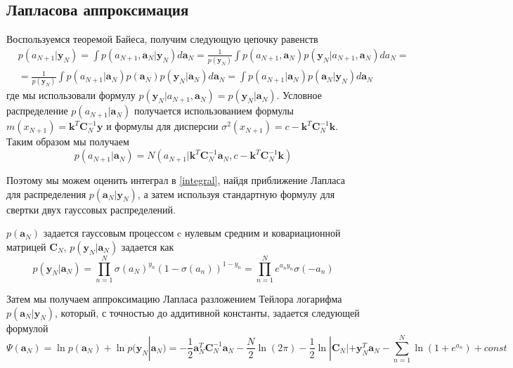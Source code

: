 {\subsection{Лапласова аппроксимация}
Воспользуемся теоремой Байеса, получим следующую цепочку равенств
\begin{equation}
    \label{integral}
    \begin{split}
         & p(a_{N+1}|\mathbf{y}_{N}) = \int p(a_{N+1},\mathbf{a}_{N}|\mathbf{y}_N)d\mathbf{a}_{N}
        = \frac{1}{p(\mathbf{y}_N)} \int p(a_{N+1},\mathbf{a}_{N})p(\mathbf{y}_{N}|a_{N+1},\mathbf{a}_{N})da_{N}=                                                                                                     \\
         & =\frac{1}{p(\mathbf{y}_{N})} \int p(a_{N+1}|\mathbf{a}_{N})p(\mathbf{a}_{N})p(\mathbf{y}_{N}|\mathbf{a}_{N})d\mathbf{a}_{N}= \int p(a_{N+1}|\mathbf{a}_{N})p(\mathbf{a}_{N}|\mathbf{y}_{N})d\mathbf{a}_{N}
    \end{split}
\end{equation}
где мы использовали формулу $p(\mathbf{y}_{N}|a_{N+1},\mathbf{a}_{N})=p(\mathbf{y}_{N}|\mathbf{a}_{N})$.
Условное распределение $p(a_{N+1}|\mathbf{a}_{N})$ получается использованием формулы  $m(x_{N+1}) = \mathbf{k}^T\mathbf{C}^{-1}_N\mathbf{y}$ и формулы для дисперсии $\sigma^2(x_{N+1}) = c-\mathbf{k}^T\mathbf{C}^{-1}_N\mathbf{k}$. Таким образом мы получаем
\[
    \label{condition}
    p(a_{N+1}|\mathbf{a}_{N})=N(a_{N+1}|\mathbf{k}^T\mathbf{C}^
    {-1}_N\mathbf{a}_{N},c-\mathbf{k}^T\mathbf{C}^{-1}_N\mathbf{k})\]

Поэтому мы можем оценить интеграл в \ref{integral}, найдя приближение Лапласа
для распределения $p(\mathbf{a}_{N}|\mathbf{y}_{N})$, а затем используя стандартную формулу для
свертки двух гауссовых распределений.

$p(\mathbf{a}_{N})$ задается гауссовым процессом c нулевым средним и ковариационной матрицей $\mathbf{C}_{N}$, $p(\mathbf{y}_{N}|\mathbf{a}_{N})$ задается как
\[
    p(\mathbf{y}_{N}|\mathbf{a}_{N})=\displaystyle \prod_{n=1}^{N}\sigma(a_{N})^{y_n}(1-\sigma(a_{n}))^{1-y_n} =
    \displaystyle \prod_{n=1}^{N} e^{a_ny_n}\sigma(-a_n)\]

Затем мы получаем аппроксимацию Лапласа разложением Тейлора логарифма $p(\mathbf{a}_{N}|\mathbf{y}_N)$, который, с точностью до аддитивной константы, задается следующей формулой
\begin{equation}
    \label{PSI}
    \Psi(\mathbf{a}_N) = \ln p(\mathbf{a}_{N})+\ln p(\mathbf{y}_N|\mathbf{a}_N)
    = -\frac{1}{2}\mathbf{a}^{T}_N\mathbf{C}^{-1}_N \mathbf{a}_N-\frac{N}{2} \ln(2\pi)-\frac{1}{2}\ln|\mathbf{C}_N|+\mathbf{y}^T_N\mathbf{a}_N-\displaystyle \sum^{N}_{n=1}\ln(1+e^{a_n})+const
\end{equation}

}
